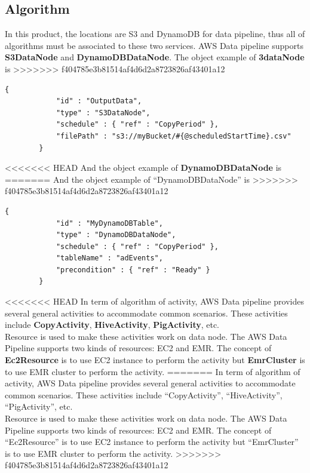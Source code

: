 	\subsection{Algorithm}
	In this product, the locations are S3 and DynamoDB for data pipeline, thus all of algorithms must be associated to these two services. AWS Data pipeline supports \textbf{S3DataNode} and \textbf{DynamoDBDataNode}. The  object example of \textbf{3dataNode} is
>>>>>>> f404785e3b81514af4d6d2a8723826af43401a12
	\begin{lstlisting}[caption=S3 Data Node example\cite{z6}]
        {
            "id" : "OutputData",
            "type" : "S3DataNode",
            "schedule" : { "ref" : "CopyPeriod" },
            "filePath" : "s3://myBucket/#{@scheduledStartTime}.csv"
        }
	\end{lstlisting}
<<<<<<< HEAD
	And the object example of \textbf{DynamoDBDataNode} is 
=======
	And the object example of “DynamoDBDataNode” is 
>>>>>>> f404785e3b81514af4d6d2a8723826af43401a12
	\begin{lstlisting}[caption=DynamoDB Data Node example\cite{z7}]
        {
            "id" : "MyDynamoDBTable",
            "type" : "DynamoDBDataNode",
            "schedule" : { "ref" : "CopyPeriod" },
            "tableName" : "adEvents",
            "precondition" : { "ref" : "Ready" }
        }
	\end{lstlisting}
<<<<<<< HEAD
	In term of algorithm of activity, AWS Data pipeline provides several general activities to accommodate common scenarios. These activities include \textbf{CopyActivity}, \textbf{HiveActivity}, \textbf{PigActivity}, etc.\\ 
    
    \noindent Resource is used to make these activities work on data node. The AWS Data Pipeline supports two kinds of resources: EC2 and EMR. The concept of \textbf{Ec2Resource} is to use EC2 instance to perform the activity but \textbf{EmrCluster} is to use EMR cluster to perform the activity. 
=======
	In term of algorithm of activity, AWS Data pipeline provides several general activities to accommodate common scenarios. These activities include “CopyActivity”, “HiveActivity”, “PigActivity”, etc.\\ 
    
    \noindent Resource is used to make these activities work on data node. The AWS Data Pipeline supports two kinds of resources: EC2 and EMR. The concept of “Ec2Resource” is to use EC2 instance to perform the activity but “EmrCluster” is to use EMR cluster to perform the activity. 
>>>>>>> f404785e3b81514af4d6d2a8723826af43401a12

